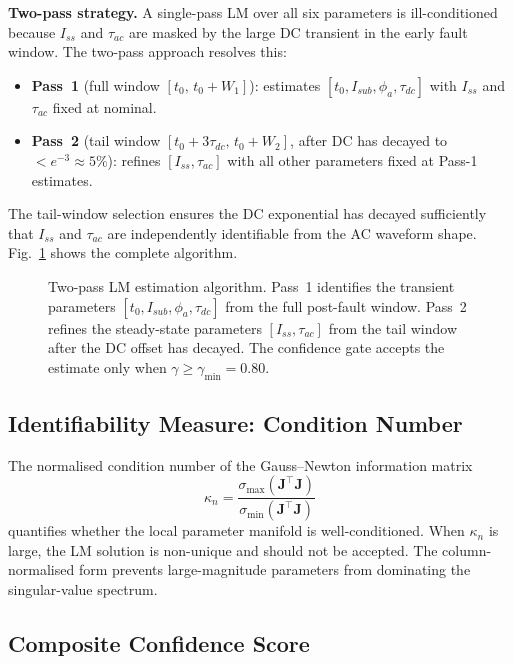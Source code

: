 \documentclass[10pt,journal,twoside]{IEEEtran}
\newcommand{\mat}[1]{\mathbf{#1}}
\newcommand{\kappan}{\kappa_n}
\newcommand{\gammin}{\gamma_{\min}}
\begin{document}
\textbf{Two-pass strategy.}  A single-pass LM over all six parameters is
ill-conditioned because $I_{ss}$ and $\tau_{ac}$ are masked by the
large DC transient in the early fault window.  The two-pass approach
resolves this:
\begin{itemize}
  \item \textbf{Pass~1} (full window $[t_0,\,t_0+W_1]$): estimates
        $[t_0, I_{sub}, \phi_a, \tau_{dc}]$ with $I_{ss}$ and
        $\tau_{ac}$ fixed at nominal.
  \item \textbf{Pass~2} (tail window $[t_0+3\tau_{dc},\,t_0+W_2]$,
        after DC has decayed to $< e^{-3} \approx 5\%$): refines
        $[I_{ss},\tau_{ac}]$ with all other parameters fixed at
        Pass-1 estimates.
\end{itemize}
The tail-window selection ensures the DC exponential has decayed
sufficiently that $I_{ss}$ and $\tau_{ac}$ are independently identifiable
from the AC waveform shape.  Fig.~\ref{fig:lm_flowchart} shows the complete
algorithm.

\begin{figure}[!t]
\centering
\scalebox{0.78}{%
%
}
\caption{Two-pass LM estimation algorithm.  Pass~1 identifies the transient
  parameters $[t_0, I_{sub}, \phi_a, \tau_{dc}]$ from the full post-fault
  window.  Pass~2 refines the steady-state parameters $[I_{ss}, \tau_{ac}]$
  from the tail window after the DC offset has decayed.  The confidence gate
  accepts the estimate only when $\gamma \geq \gammin = 0.80$.}
\label{fig:lm_flowchart}
\end{figure}

\subsection{Identifiability Measure: Condition Number}
\label{sec:estimation:identifiability}

The normalised condition number of the Gauss--Newton information matrix
\begin{equation}
\kappan =
  \frac{\sigma_{\max}(\mat{J}^\top\mat{J})}
       {\sigma_{\min}(\mat{J}^\top\mat{J})}
\label{eq:kappa}
\end{equation}
quantifies whether the local parameter manifold is well-conditioned.
When $\kappan$ is large, the LM solution is non-unique and should not
be accepted.  The column-normalised form prevents large-magnitude parameters
from dominating the singular-value spectrum.

\subsection{Composite Confidence Score}
\label{sec:estimation:confidence}
\end{document}
